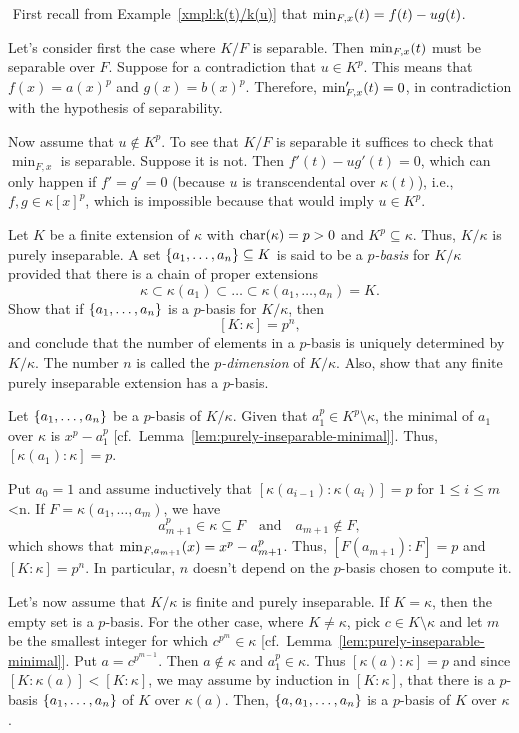 \begin{solution}${}$ First recall from Example~\ref{xmpl:k(t)/k(u)} that $\operatorname{min}_{F,x}(t)=f(t)-ug(t)$.
    
    Let's consider first the case where $K/F$ is separable. Then $\operatorname{min}_{F,x}(t)$ must be separable over $F$. Suppose for a contradiction that $u\in K^p$. This means that $f(x)=a(x)^p$ and $g(x)=b(x)^p$. Therefore, $\operatorname{min}_{F,x}'(t)=0$, in contradiction with the hypothesis of separability.

    Now assume that $u\notin K^p$. To see that $K/F$ is separable it suffices to check that $\min_{F,x}$ is separable. Suppose it is not. Then $f'(t)-ug'(t)=0$, which can only happen if $f'=g'=0$ (because $u$ is transcendental over $\kappa(t)$), i.e., $f,g\in\kappa[x]^p$, which is impossible because that would imply $u\in K^p$.
\end{solution}

\begin{probl}
    Let\/ $K$ be a finite extension of\/ $\kappa$ with\/ $\operatorname{char}(\kappa) = p > 0$ and\/ $K^p \subseteq \kappa$. Thus, $K / \kappa$ is purely inseparable. A set\/ $\{a_1, \dots, a_n\} \subseteq K$ is said to be a \textsl{$p$-basis} for\/ $K / \kappa$ provided that there is a chain of proper extensions 
    $$
        \kappa \subset \kappa(a_1) \subset \dots \subset \kappa(a_1,\dots,a_n) = K.
    $$
    Show that if\/ $\{a_1, \dots, a_n\}$ is a\/ $p$-basis for\/ $K / \kappa$, then 
    $$
        [K : \kappa] = p^n,
    $$
    and conclude that the number of elements in a\/ $p$-basis is uniquely determined by\/ $K / \kappa$. The number\/ $n$ is called the \textsl{$p$-dimension} of\/ $K / \kappa$. Also, show that any finite purely inseparable extension has a\/ $p$-basis.
\end{probl}

\begin{solution}
    Let $\{a_1,\dots,a_n\}$ be a $p$-basis of $K/\kappa$. Given that $a_1^p\in K^p\setminus\kappa$, the minimal of $a_1$ over $\kappa$ is $x^p-a_1^p$ [cf.~Lemma~\ref{lem:purely-inseparable-minimal}]. Thus, $[\kappa(a_1):\kappa]=p$.
    
    Put $a_0=1$ and assume inductively that $[\kappa(a_{i-1}):\kappa(a_i)]=p$ for $1\le i\le m$<n. If $F=\kappa(a_1,\dots,a_m)$, we have 
    $$
        a_{m+1}^p\in\kappa\subseteq F\quad\text{and}\quad
            a_{m+1}\notin F,
    $$
    which shows that $\operatorname{min}_{F,a_{m+1}}(x)=x^p-a_{m+1}^p$. Thus, $[F(a_{m+1}):F]=p$ and $[K:\kappa]=p^n$. In particular, $n$ doesn't depend on the $p$-basis chosen to compute it.

    Let's now assume that $K/\kappa$ is finite and purely inseparable. If $K=\kappa$, then the empty set is a $p$-basis. For the other case, where $K\ne\kappa$, pick $c\in K\setminus\kappa$ and let $m$ be the smallest integer for which $c^{p^m}\in\kappa$ [cf.~Lemma~\ref{lem:purely-inseparable-minimal}]. Put $a=c^{p^{m-1}}$. Then $a\notin\kappa$ and $a_1^p\in\kappa$. Thus $[\kappa(a):\kappa]=p$ and since $[K:\kappa(a)]<[K:\kappa]$, we may assume by induction in $[K:\kappa]$, that there is a $p$-basis $\{a_1,\dots,a_n\}$ of $K$ over $\kappa(a)$. Then, $\{a,a_1,\dots,a_n\}$ is a $p$-basis of $K$ over $\kappa$.
\end{solution}

